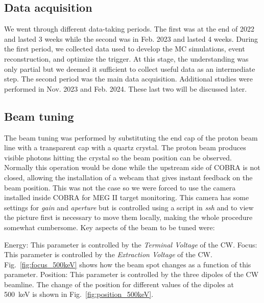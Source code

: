 \begin{refsection}
\section{Data acquisition}
    We went through different data-taking periods. 
    The first was at the end of 2022 and lasted 3 weeks while the second was in Feb. 2023 and lasted 4 weeks.
    During the first period, we collected data used to develop the MC simulations, event reconstruction, and optimize the trigger.
    At this stage, the understanding was only partial but we deemed it sufficient to collect useful data as an intermediate step.
    The second period was the main data acquisition. 
    Additional studies were performed in Nov. 2023 and Feb. 2024.
    These last two will be discussed later.
    
    \subsection{Beam tuning}
        The beam tuning was performed by substituting the end cap of the proton beam line with a transparent cap with a quartz crystal. 
        The proton beam produces visible photons hitting the crystal so the beam position can be observed.
        Normally this operation would be done while the upstream side of COBRA is not closed, allowing the installation of a webcam that gives instant feedback on the beam position.
        This was not the case so we were forced to use the camera installed inside COBRA for MEG II target monitoring.
        This camera has some settings for \textit{gain} and \textit{aperture} but is controlled using a script in \textit{ssh} and to view the picture first is necessary to move them locally, making the whole procedure somewhat cumbersome.
        Key aspects of the beam to be tuned were: 
        \begin{outline}
            \1 Energy: This parameter is controlled by the \textit{Terminal Voltage} of the CW.
            \1 Focus: This parameter is controlled by the \textit{Extraction Voltage} of the CW. Fig.~\ref{fig:focus_500keV} shows how the beam spot changes as a function of this parameter. 
            \1 Position: This parameter is controlled by the three dipoles of the CW beamline. The change of the position for different values of the dipoles at \SI{500}{keV} is shown in Fig.~\ref{fig:position_500keV}.
        \end{outline}


\end{refsection}
